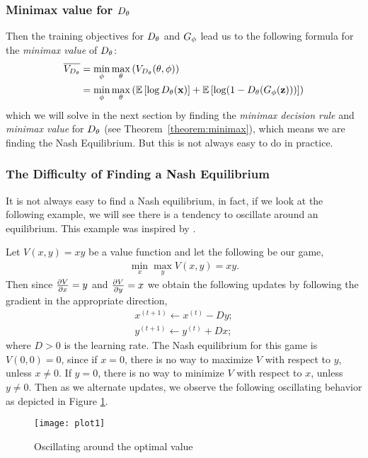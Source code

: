 \subsubsection{Minimax value for $D_\theta$}

Then the training objectives for $D_\theta$ and $G_\phi$ lead us to the
following formula for the \textit{minimax value} of $D_\theta$:
\begin{align} \overline{V_{D_\theta}} & =
  \min_{\phi}\max_{\theta}\left(V_{D_\theta}(\theta, \phi) \right) \\ & =
  \min_{\phi}\max_{\theta}\left(\mathbb{E}\left[\log{D_\theta(\mathbf{x})}\right] +
    \mathbb{E}\left[\log(1 - D_\theta(G_\phi(\mathbf{z})))\right] \right)
\end{align} which we will solve in the next section by finding the
\textit{minimax decision rule} and \textit{minimax value} for $D_\theta$
(see Theorem~\ref{theorem:minimax}), which means we are finding the
Nash Equilibrium.  But this is not always easy to do in practice.

\subsubsection{The Difficulty of Finding a Nash Equilibrium}
\label{sec:difficulty}

It is not always easy to find a Nash equilibrium, in fact, if we look
at the following example, we will see there is a tendency to oscillate
around an equilibrium. This example was inspired by
\cite{ref:weng-2017}.

\begin{example} Let $V(x, y) = xy$ be a value function and let the
following be our game,
  \begin{align} \min_x\max_yV(x, y) = xy.
  \end{align} Then since ${\partial{V} \over \partial{x}} = y$ and
  ${\partial{V} \over \partial{y}} = x$ we obtain the following updates
  by following the gradient in the appropriate direction,
  \begin{align} x^{(t+1)} \gets x^{(t)} - D y; \\ y^{(t+1)} \gets
y^{(t)} + D x;
  \end{align} where $D > 0$ is the learning rate. The Nash equilibrium
  for this game is $V(0, 0) = 0$, since if $x = 0$, there is no way to
  maximize $V$ with respect to $y$, unless $x \not = 0$. If $y = 0$,
  there is no way to minimize $V$ with respect to $x$, unless $y \not =
  0$. Then as we alternate updates, we observe the following oscillating
  behavior as depicted in Figure \ref{fig:alternating}.

  \begin{figure}[H] \centering
    \texttt{[image: plot1]}
    \caption{Oscillating around the optimal value}
    \label{fig:alternating}
  \end{figure}
\end{example}

